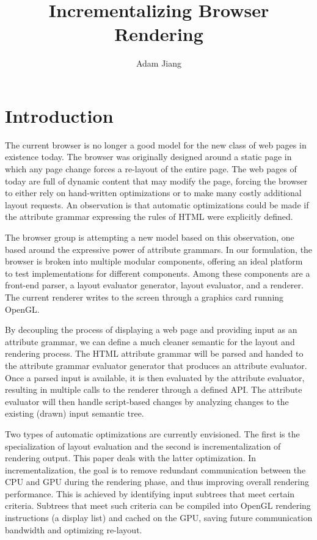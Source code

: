 \documentclass[11pt]{article}
\begin{document}
\title{Incrementalizing Browser Rendering}

\author{
Adam Jiang
}

\maketitle

\section{Introduction}

The current browser is no longer a good model for the new class of web pages in existence today. The browser was originally designed around a static page in which any page change forces a re-layout of the entire page. The web pages of today are full of dynamic content that may modify the page, forcing the browser to either rely on hand-written optimizations or to make many costly additional layout requests. An observation is that automatic optimizations could be made if the attribute grammar expressing the rules of HTML were explicitly defined.

The browser group is attempting a new model based on this observation, one based around the expressive power of attribute grammars. In our formulation, the browser is broken into multiple modular components, offering an ideal platform to test implementations for different components. Among these components are a front-end parser, a layout evaluator generator, layout evaluator, and a renderer. The current renderer writes to the screen through a graphics card running OpenGL.

By decoupling the process of displaying a web page and providing input as an attribute grammar, we can define a much cleaner semantic for the layout and rendering process.  The HTML attribute grammar will be parsed and handed to the attribute grammar evaluator generator that produces an attribute evaluator. Once a parsed input is available, it is then evaluated by the attribute evaluator, resulting in multiple calls to the renderer through a defined API. The attribute evaluator will then handle script-based changes by analyzing changes to the existing (drawn) input semantic tree.

Two types of automatic optimizations are currently envisioned. The first is the specialization of layout evaluation and the second is incrementalization of rendering output. This paper deals with the latter optimization. In incrementalization, the goal is to remove redundant communication between the CPU and GPU during the rendering phase, and thus improving overall rendering performance. This is achieved by identifying input subtrees that meet certain criteria. Subtrees that meet such criteria can be compiled into OpenGL rendering instructions (a display list) and cached on the GPU, saving future communication bandwidth and optimizing re-layout.
\end{document}

